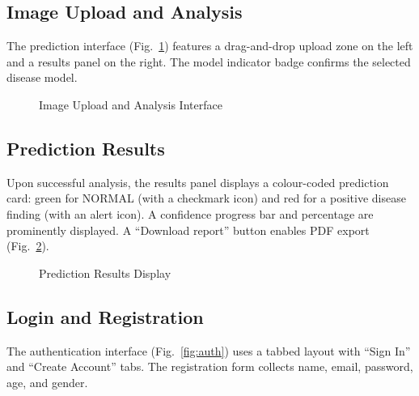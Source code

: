 \documentclass[12pt, a4paper, oneside]{report}
\begin{document}
\subsection{Image Upload and Analysis}

The prediction interface (Fig.~\ref{fig:upload}) features a drag-and-drop upload zone on the left and a results panel on the right. The model indicator badge confirms the selected disease model.

\begin{figure}[H]
\centering
{}
\caption{Image Upload and Analysis Interface}
\label{fig:upload}
\end{figure}

\subsection{Prediction Results}

Upon successful analysis, the results panel displays a colour-coded prediction card: green for NORMAL (with a checkmark icon) and red for a positive disease finding (with an alert icon). A confidence progress bar and percentage are prominently displayed. A ``Download report'' button enables PDF export (Fig.~\ref{fig:results}).

\begin{figure}[H]
\centering
{}
\caption{Prediction Results Display}
\label{fig:results}
\end{figure}

\subsection{Login and Registration}

The authentication interface (Fig.~\ref{fig:auth}) uses a tabbed layout with ``Sign In'' and ``Create Account'' tabs. The registration form collects name, email, password, age, and gender.
\end{document}
